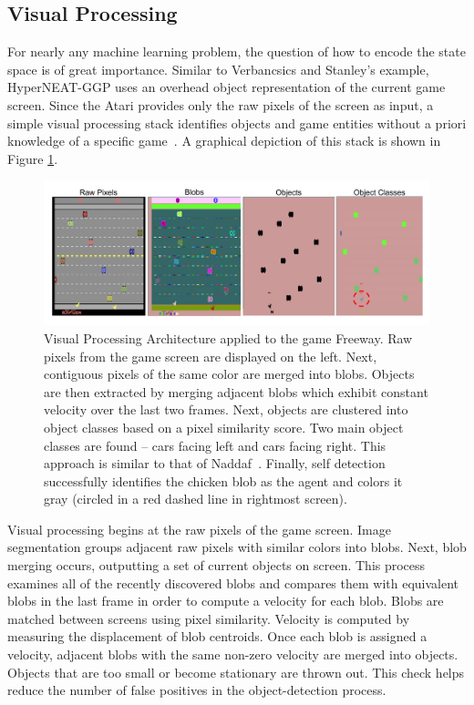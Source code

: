 \documentclass{acm_proc_article-sp}
\begin{document}
\subsection{Visual Processing}
For nearly any machine learning problem, the question of how to encode the state space is of great importance. Similar to Verbancsics and Stanley's example, HyperNEAT-GGP uses an overhead object representation of the current game screen. Since the Atari provides only the raw pixels of the screen as input, a simple visual processing stack identifies objects and game entities without a priori knowledge of a specific game~\cite{naddaf10}. A graphical depiction of this stack is shown in Figure \ref{fig:visproc}.

\begin{figure}[htp]
\begin{center}
\includegraphics[width=\textwidth]{figures/AtariArch}
\end{center}
\caption{Visual Processing Architecture applied to the game Freeway. Raw pixels from the game screen are displayed on the left. Next, contiguous pixels of the same color are merged into blobs. Objects are then extracted by merging adjacent blobs which exhibit constant velocity over the last two frames. Next, objects are clustered into object classes based on a pixel similarity score. Two main object classes are found -- cars facing left and cars facing right. This approach is similar to that of Naddaf~\cite{naddaf10}. Finally, self detection successfully identifies the chicken blob as the agent and colors it gray (circled in a red dashed line in rightmost screen).}
\label{fig:visproc}
\end{figure}

Visual processing begins at the raw pixels of the game screen. Image segmentation groups adjacent raw pixels with similar colors into blobs. Next, blob merging occurs, outputting a set of current objects on screen. This process examines all of the recently discovered blobs and compares them with equivalent blobs in the last frame in order to compute a velocity for each blob. Blobs are matched between screens using pixel similarity. Velocity is computed by measuring the displacement of blob centroids. Once each blob is assigned a velocity, adjacent blobs with the same non-zero velocity are merged into objects. Objects that are too small or become stationary are thrown out. This check helps reduce the number of false positives in the object-detection process.
\end{document}
